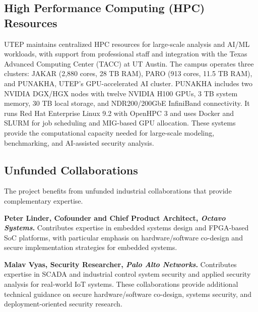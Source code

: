 \documentclass[11pt,onecolumn]{article}
\begin{document}
\subsection*{High Performance Computing (HPC) Resources}
UTEP maintains centralized HPC resources for large-scale analysis and AI/ML workloads, with support from professional staff and integration with the Texas Advanced Computing Center (TACC) at UT Austin. The campus operates three clusters: JAKAR (2,880 cores, 28 TB RAM), PARO (913 cores, 11.5 TB RAM), and PUNAKHA, UTEP's GPU-accelerated AI cluster. PUNAKHA includes two NVIDIA DGX/HGX nodes with twelve NVIDIA H100 GPUs, 3 TB system memory, 30 TB local storage, and NDR200/200GbE InfiniBand connectivity. It runs Red Hat Enterprise Linux 9.2 with OpenHPC 3 and uses Docker and SLURM for job scheduling and MIG-based GPU allocation. These systems provide the computational capacity needed for large-scale modeling, benchmarking, and AI-assisted security analysis.

\subsection*{Unfunded Collaborations}
The project benefits from unfunded industrial collaborations that provide complementary expertise.

\textbf{Peter Linder, Cofounder and Chief Product Architect, \textit{Octavo Systems}.} Contributes expertise in embedded systems design and FPGA-based SoC platforms, with particular emphasis on hardware/software co-design and secure implementation strategies for embedded systems.

\textbf{Malav Vyas, Security Researcher, \textit{Palo Alto Networks}.} Contributes expertise in SCADA and industrial control system security and applied security analysis for real-world IoT systems. These collaborations provide additional technical guidance on secure hardware/software co-design, systems security, and deployment-oriented security research.
\end{document}
